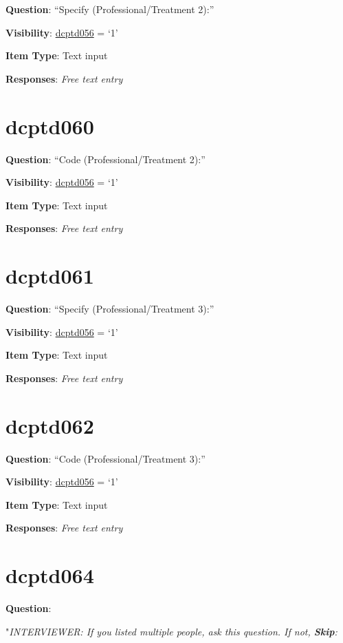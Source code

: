 \documentclass[]{book}
\begin{document}
\textbf{Question}: ``Specify (Professional/Treatment 2):''

\textbf{Visibility}: \protect\hyperlink{dcptd056}{dcptd056} = `1'

\textbf{Item Type}: Text input

\textbf{Responses}: \emph{Free text entry}

\hypertarget{dcptd060}{%
\section{dcptd060}\label{dcptd060}}

\textbf{Question}: ``Code (Professional/Treatment 2):''

\textbf{Visibility}: \protect\hyperlink{dcptd056}{dcptd056} = `1'

\textbf{Item Type}: Text input

\textbf{Responses}: \emph{Free text entry}

\hypertarget{dcptd061}{%
\section{dcptd061}\label{dcptd061}}

\textbf{Question}: ``Specify (Professional/Treatment 3):''

\textbf{Visibility}: \protect\hyperlink{dcptd056}{dcptd056} = `1'

\textbf{Item Type}: Text input

\textbf{Responses}: \emph{Free text entry}

\hypertarget{dcptd062}{%
\section{dcptd062}\label{dcptd062}}

\textbf{Question}: ``Code (Professional/Treatment 3):''

\textbf{Visibility}: \protect\hyperlink{dcptd056}{dcptd056} = `1'

\textbf{Item Type}: Text input

\textbf{Responses}: \emph{Free text entry}

\hypertarget{dcptd064}{%
\section{dcptd064}\label{dcptd064}}

\textbf{Question}:

"\emph{INTERVIEWER: If you listed multiple people, ask this question. If not, \textbf{Skip}:}
\end{document}

